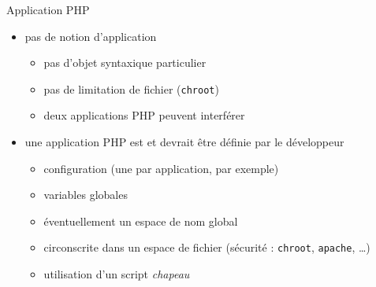 \begin{frame}{Application PHP}
\begin{itemize}
	\item pas de notion d'application
	\begin{itemize}
		\item pas d'objet syntaxique particulier
		\item pas de limitation de fichier (\texttt{chroot})
		\item deux applications PHP peuvent interférer
	\end{itemize}
	\item une application PHP est et devrait être définie par le développeur
	\begin{itemize}
		\item configuration (une par application, par exemple)
		\item variables globales
		\item éventuellement un espace de nom global
		\item circonscrite dans un espace de fichier (sécurité : \texttt{chroot}, \texttt{apache}, \ldots)
		\item utilisation d'un script \emph{chapeau}
	\end{itemize}
\end{itemize}

\end{frame}


